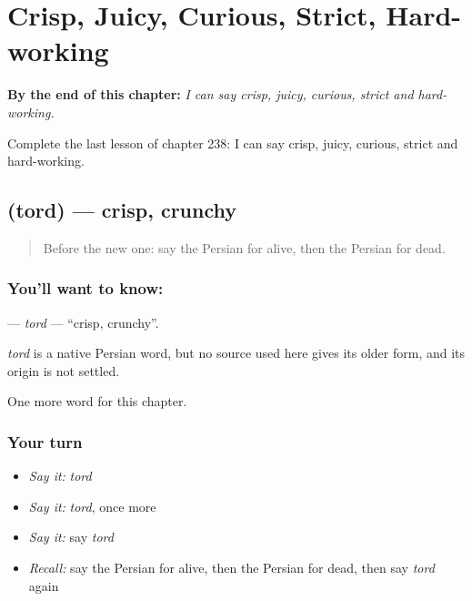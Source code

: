 
\chapter{Crisp, Juicy, Curious, Strict, Hard-working}
\label{ch:fa-crisp-juicy-curious-strict-hard-working}

\begin{chapteropening}
\textbf{By the end of this chapter:} \emph{I can say crisp, juicy, curious, strict and hard-working.}

Complete the last lesson of chapter 238: I can say crisp, juicy, curious, strict and hard-working.
\end{chapteropening}

\section[\texorpdfstring{\fa{ترد} (tord)}{ترد (tord)}]{ (tord) — crisp, crunchy}

\label{lesson:FA-C238-tord}



\begin{quote}
Before the new one: say the Persian for alive, then the Persian for dead.
\end{quote}

\subsection*{You'll want to know: }
\textbf{} — \emph{tord} — \textquotedblleft{}crisp, crunchy\textquotedblright{}.

\begin{cousinweb}
\emph{tord} is a native Persian word, but no source used here gives its older form, and its origin is not settled.
\end{cousinweb}

\begin{grammarlens}[title={What you've built}]
One more word for this chapter.
\end{grammarlens}

\subsection*{Your turn}
\begin{itemize}
\raggedright
  \item \emph{Say it:} \emph{tord}
  \item \emph{Say it:} \emph{tord}, once more
  \item \emph{Say it:} say \emph{tord}
  \item \emph{Recall:} say the Persian for alive, then the Persian for dead, then say \emph{tord} again
\end{itemize}

